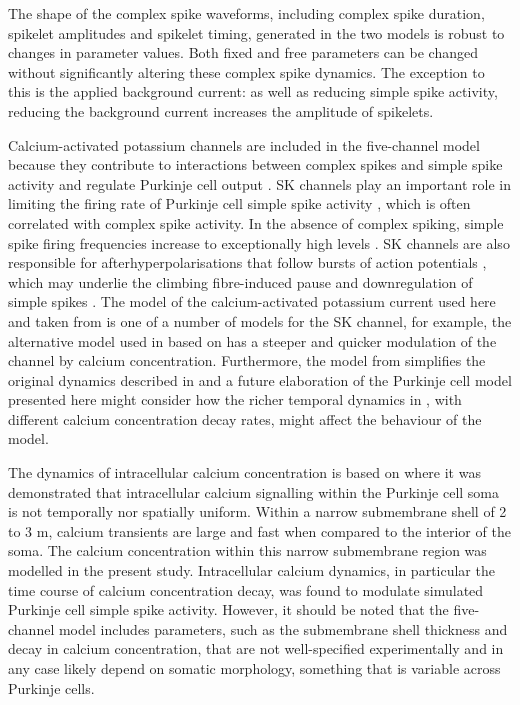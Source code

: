 \documentclass[utf8]{frontiersSCNS} %
\begin{document}
The shape of the complex spike waveforms, including complex spike
duration, spikelet amplitudes and spikelet timing, generated in the
two models is robust to changes in parameter values. Both fixed and
free parameters can be changed without significantly altering these
complex spike dynamics. The exception to this is the applied
background current: as well as reducing simple spike activity,
reducing the background current increases the amplitude of spikelets.

Calcium-activated potassium channels are included in the five-channel
model because they contribute to interactions between complex spikes
and simple spike activity and regulate Purkinje cell output
\cite{TankEtAl1988, McKayEtAl2007}. SK channels play an important role
in limiting the firing rate of Purkinje cell simple spike activity
\cite{WomackEtAl2003} \cite{EgorovaEtAl2014}, which is often
correlated with complex spike activity. In the absence of complex
spiking, simple spike firing frequencies increase to exceptionally
high levels \cite{CerminaraRawson2004}. SK channels are also
responsible for afterhyperpolarisations that follow bursts of action
potentials \cite{HosyEtAl2011}, which may underlie the climbing
fibre-induced pause and downregulation of simple spikes
\cite{Xian-HuaEtAl2017}. The model of the calcium-activated potassium
current used here and taken from \cite{GilliesWillshaw2006} is one of
a number of models for the SK channel, for example, the alternative
model used in \cite{GriffithEtAl2016} based on
\cite{ChayKeizer1983,XiaEtAl1998} has a steeper and quicker modulation
of the channel by calcium concentration. Furthermore, the model from
\cite{GilliesWillshaw2006} simplifies the original dynamics described
in \cite{HirschbergEtAl1998} and a future elaboration of the Purkinje
cell model presented here might consider how the richer temporal
dynamics in \cite{HirschbergEtAl1998}, with different calcium
concentration decay rates, might affect the behaviour of the model.

The dynamics of intracellular calcium concentration is based on
\cite{EilersEtAl1995} where it was demonstrated that intracellular
calcium signalling within the Purkinje cell soma is not temporally nor
spatially uniform. Within a narrow submembrane shell of 2 to 3 \textmu
m, calcium transients are large and fast when compared to the interior
of the soma. The calcium concentration within this narrow submembrane
region was modelled in the present study. Intracellular calcium
dynamics, in particular the time course of calcium concentration
decay, was found to modulate simulated Purkinje cell simple spike
activity. However, it should be
noted that the five-channel model includes parameters, such as the
submembrane shell thickness and decay in calcium concentration, that
are not well-specified experimentally and in any case likely depend on
somatic morphology, something that is variable across Purkinje cells.
\end{document}
